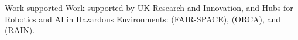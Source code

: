 
\begin{acks}
Work supported Work supported by UK Research and Innovation, and  Hubs for Robotics and AI in Hazardous Environments:  (FAIR-SPACE),  (ORCA), and  (RAIN).
\end{acks}
